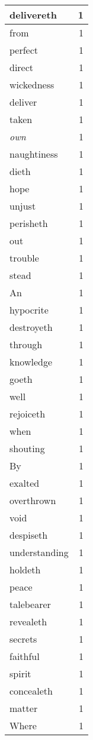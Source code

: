 \begin{center}
\begin{longtable}{l|r}
delivereth & 1\\ \hline 
from & 1\\ \hline 
perfect & 1\\ \hline 
direct & 1\\ \hline 
wickedness & 1\\ \hline 
deliver & 1\\ \hline 
taken & 1\\ \hline 
\emph{own} & 1\\ \hline 
naughtiness & 1\\ \hline 
dieth & 1\\ \hline 
hope & 1\\ \hline 
unjust & 1\\ \hline 
perisheth & 1\\ \hline 
out & 1\\ \hline 
trouble & 1\\ \hline 
stead & 1\\ \hline 
An & 1\\ \hline 
hypocrite & 1\\ \hline 
destroyeth & 1\\ \hline 
through & 1\\ \hline 
knowledge & 1\\ \hline 
goeth & 1\\ \hline 
well & 1\\ \hline 
rejoiceth & 1\\ \hline 
when & 1\\ \hline 
shouting & 1\\ \hline 
By & 1\\ \hline 
exalted & 1\\ \hline 
overthrown & 1\\ \hline 
void & 1\\ \hline 
despiseth & 1\\ \hline 
understanding & 1\\ \hline 
holdeth & 1\\ \hline 
peace & 1\\ \hline 
talebearer & 1\\ \hline 
revealeth & 1\\ \hline 
secrets & 1\\ \hline 
faithful & 1\\ \hline 
spirit & 1\\ \hline 
concealeth & 1\\ \hline 
matter & 1\\ \hline 
Where & 1\\ \hline 

\end{longtable}
\end{center}
